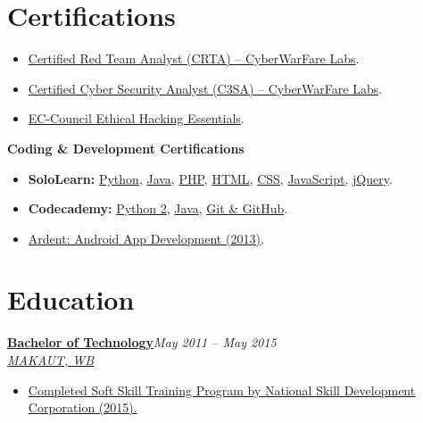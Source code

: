 \documentclass[10pt,a4paper]{article}
\newcommand{\resumeEntry}[4]{
    \textbf{#1}\hfill \textit{#2}\\
    \textit{#3}\hfill #4
    \vspace{1pt}
}
\begin{document}
\section{Certifications}

\begin{itemize}
    \item \href{https://zishanhack.com/about/img/CERT/crta.jpg}{Certified Red Team Analyst (CRTA) -- CyberWarFare Labs}.
    \item \href{https://app.kajabi.com/certificates/5481eb7c}{Certified Cyber Security Analyst (C3SA) -- CyberWarFare Labs}.
    \item \href{https://web.archive.org/web/20240407035000/https://codered.eccouncil.org/certificate/9a734562-7963-400b-84b6-4f04d7477bd6?finalAssessment=true&type=1&logged=false}{EC-Council Ethical Hacking Essentials}.
\end{itemize}

\textbf{Coding \& Development Certifications}
\begin{itemize}
    \item \textbf{SoloLearn:} \href{https://web.archive.org/web/20230826182653/https://www.sololearn.com/certificates/CT-ESUIEOIL}{Python}, \href{https://web.archive.org/web/20230827045336/https://www.sololearn.com/certificates/CT-6MPPT9PS}{Java}, \href{https://web.archive.org/web/20230827044856/https://www.sololearn.com/certificates/CT-URP0SEVV}{PHP}, \href{https://web.archive.org/web/20230827045028/https://www.sololearn.com/certificates/CT-O8CPNDPQ}{HTML}, \href{https://web.archive.org/web/20230827044259/https://www.sololearn.com/certificates/CT-6XXLMJLU}{CSS}, \href{https://web.archive.org/web/20230827044658/https://www.sololearn.com/certificates/CT-V5B4OHBJ}{JavaScript}, \href{https://web.archive.org/web/20230827045224/https://www.sololearn.com/certificates/CT-8D99WRRR}{jQuery}.
    \item \textbf{Codecademy:} \href{https://www.codecademy.com/profiles/ZishanAdThandar/certificates/b97fd4d87a816c761a674af1b5391ef1}{Python 2}, \href{https://www.codecademy.com/profiles/ZishanAdThandar/certificates/d3f89367b558583e361640f778191345}{Java}, \href{https://www.codecademy.com/profiles/ZishanAdThandar/certificates/a8ab218d5950c29861635cc0bf12fd13}{Git \& GitHub}.
    \item \href{https://zishanhack.com/about/img/CERT/ardent.jpg}{Ardent: Android App Development (2013)}.
\end{itemize}

\section{Education}

\resumeEntry{\href{https://zishanhack.com/about/img/CERT/makaut.jpg}{Bachelor of Technology}}{May 2011 -- May 2015}{\href{https://zishanhack.com/about/img/CERT/makaut.jpg}{MAKAUT, WB}}{}
\begin{itemize}
    \item \href{https://zishanhack.com/about/img/CERT/nsdc.jpg}{Completed Soft Skill Training Program by National Skill Development Corporation (2015).}
\end{itemize}
\end{document}
